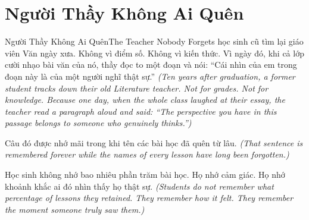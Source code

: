 \section{Người Thầy Không Ai Quên}
\begin{truyen}{Người Thầy Không Ai Quên}{The Teacher Nobody Forgets}
 học sinh cũ tìm lại giáo viên Văn ngày xưa. Không vì điểm số. Không vì kiến thức. Vì ngày đó, khi cả lớp cười nhạo bài văn của nó, thầy đọc to một đoạn và nói: ``Cái nhìn của em trong đoạn này là của một người nghĩ thật sự.''
\textit{(Ten years after graduation, a former student tracks down their old Literature teacher. Not for grades. Not for knowledge. Because one day, when the whole class laughed at their essay, the teacher read a paragraph aloud and said: ``The perspective you have in this passage belongs to someone who genuinely thinks.'')}

Câu đó được nhớ mãi trong khi tên các bài học đã quên từ lâu.
\textit{(That sentence is remembered forever while the names of every lesson have long been forgotten.)}

\begin{baihoc}
Học sinh không nhớ bao nhiêu phần trăm bài học. Họ nhớ cảm giác. Họ nhớ khoảnh khắc ai đó nhìn thấy họ thật sự.
\textit{(Students do not remember what percentage of lessons they retained. They remember how it felt. They remember the moment someone truly saw them.)}
\end{baihoc}
\end{truyen}

